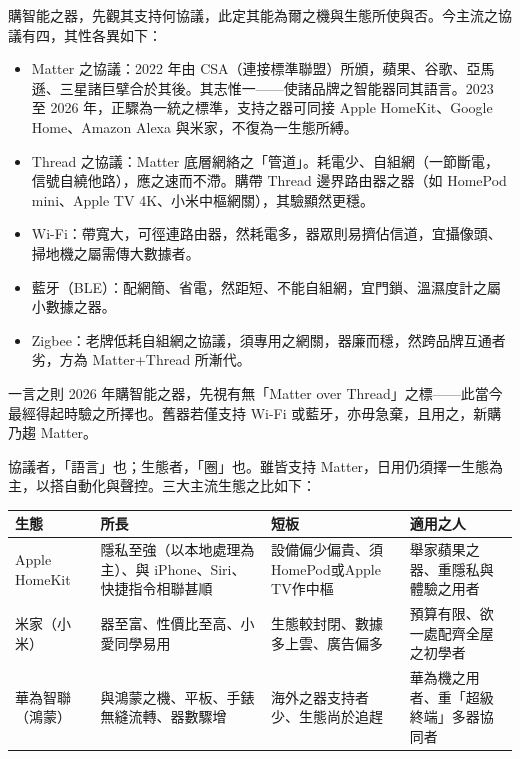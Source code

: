 


購智能之器，先觀其支持何協議，此定其能為爾之機與生態所使與否。今主流之協議有四，其性各異如下：

\begin{itemize}
  \item Matter 之協議：2022 年由 CSA（連接標準聯盟）所頒，蘋果、谷歌、亞馬遜、三星諸巨擘合於其後。其志惟一——使諸品牌之智能器同其語言。2023 至 2026 年，正驟為一統之標準，支持之器可同接 Apple HomeKit、Google Home、Amazon Alexa 與米家，不復為一生態所縛。
  \item Thread 之協議：Matter 底層網絡之「管道」。耗電少、自組網（一節斷電，信號自繞他路），應之速而不滯。購帶 Thread 邊界路由器之器（如 HomePod mini、Apple TV 4K、小米中樞網關），其驗顯然更穩。
  \item Wi-Fi：帶寬大，可徑連路由器，然耗電多，器眾則易擠佔信道，宜攝像頭、掃地機之屬需傳大數據者。
  \item 藍牙（BLE）：配網簡、省電，然距短、不能自組網，宜門鎖、溫濕度計之屬小數據之器。
  \item Zigbee：老牌低耗自組網之協議，須專用之網關，器廉而穩，然跨品牌互通者劣，方為 Matter+Thread 所漸代。
\end{itemize}

\begin{tcbinfo}{一言之則}
2026 年購智能之器，先視有無「Matter over Thread」之標——此當今最經得起時驗之所擇也。舊器若僅支持 Wi-Fi 或藍牙，亦毋急棄，且用之，新購乃趨 Matter。

\end{tcbinfo}


協議者，「語言」也；生態者，「圈」也。雖皆支持 Matter，日用仍須擇一生態為主，以搭自動化與聲控。三大主流生態之比如下：

\begin{center}
\begin{tabularx}{\linewidth}{|X|X|X|X|}
\hline
\textbf{生態} & \textbf{所長} & \textbf{短板} & \textbf{適用之人} \tabularnewline
\hline
Apple HomeKit & 隱私至強（以本地處理為主）、與 iPhone、Siri、快捷指令相聯甚順 & 設備偏少偏貴、須HomePod或Apple TV作中樞 & 舉家蘋果之器、重隱私與體驗之用者 \tabularnewline
米家（小米） & 器至富、性價比至高、小愛同學易用 & 生態較封閉、數據多上雲、廣告偏多 & 預算有限、欲一處配齊全屋之初學者 \tabularnewline
華為智聯（鴻蒙） & 與鴻蒙之機、平板、手錶無縫流轉、器數驟增 & 海外之器支持者少、生態尚於追趕 & 華為機之用者、重「超級終端」多器協同者 \tabularnewline
\hline
\end{tabularx}
\end{center}


